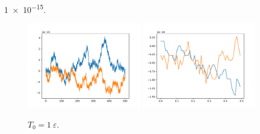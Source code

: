 \num{1e-15}.
\begin{figure}
    \centering
    \includegraphics[width=0.45\textwidth]{A1/build/aequi1_V.pdf}
    \includegraphics[width=0.45\textwidth]{A1/build/aequi1_VV.pdf}
    \caption{$T_\text{0} = 1\:\varepsilon$.}
    \label{fig:v1}
\end{figure} 

